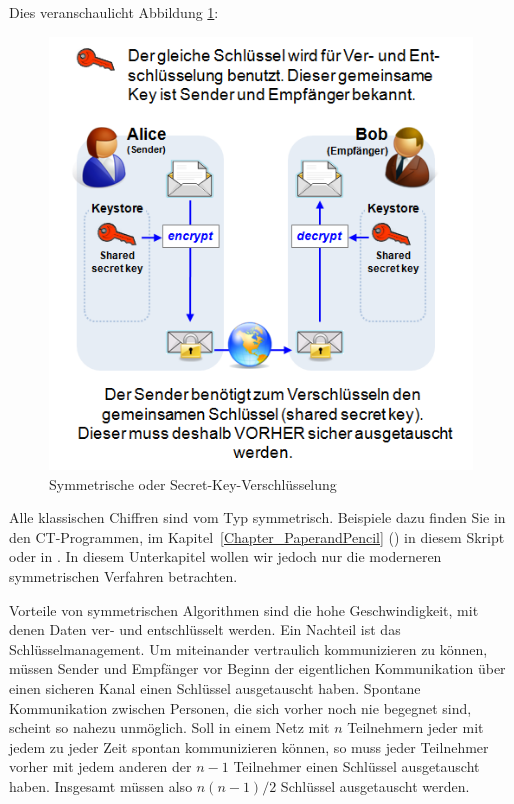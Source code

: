 \begin{refsegment}
Dies veranschaulicht Abbildung \ref{cm_Figure_Symmetric-Enc_Secret-Key-Enc}:
\begin{figure}[ht]
\begin{center}
\includegraphics[scale=0.7]{figures/SymmetricEnc_Figure_Chap1_de.png}
\caption{Symmetrische oder Secret-Key-Verschlüsselung}
\label{cm_Figure_Symmetric-Enc_Secret-Key-Enc}
\end{center}
\end{figure}

Alle klassischen Chiffren sind vom Typ symmetrisch. Beispiele dazu finden Sie
in den CT-Programmen, im Kapitel~\ref{Chapter_PaperandPencil}
(\glqq {}\grqq)
in diesem Skript oder in \cite{Nichols1996}.
In diesem Unterkapitel wollen wir jedoch nur die moderneren symmetrischen
Verfahren betrachten.

Vorteile von symmetrischen Algorithmen sind die hohe
Geschwindigkeit, mit denen Daten ver- und entschlüsselt werden.
Ein Nachteil ist das Schlüsselmanagement. Um miteinander
vertraulich kommunizieren zu können, müssen Sender und
Empfänger vor Beginn der eigentlichen Kommunikation über einen
sicheren Kanal einen Schlüssel ausgetauscht haben. Spontane
Kommunikation zwischen Personen, die sich vorher noch nie begegnet
sind, scheint so nahezu unmöglich. Soll in einem Netz mit $ n $
Teilnehmern jeder mit jedem zu jeder Zeit spontan kommunizieren
können, so muss jeder Teilnehmer vorher mit jedem anderen der
$n - 1$ Teilnehmer einen Schlüssel ausgetauscht haben. Insgesamt
müssen also $n(n - 1)/2$ Schlüssel ausgetauscht werden.




\end{refsegment}
